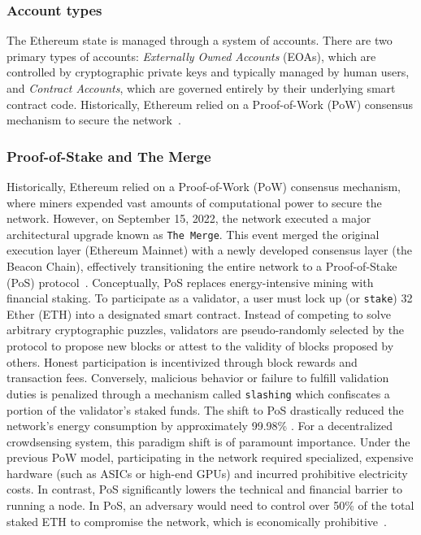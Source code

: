 \subsubsection{Account types}
The Ethereum state is managed through a system of accounts.
There are two primary types of accounts: \emph{Externally Owned Accounts} (EOAs), which are controlled by cryptographic private keys and typically managed by human users, and \emph{Contract Accounts}, which are governed entirely by their underlying smart contract code.
Historically, Ethereum relied on a Proof-of-Work (PoW) consensus mechanism to secure the network~\cite{ethereum}.

\subsubsection{Proof-of-Stake and The Merge}
Historically, Ethereum relied on a Proof-of-Work (PoW) consensus mechanism, where miners expended vast amounts of computational power to secure the network.
However, on September 15, 2022, the network executed a major architectural upgrade known as \texttt{The Merge}.
This event merged the original execution layer (Ethereum Mainnet) with a newly developed consensus layer (the Beacon Chain), effectively transitioning the entire network to a Proof-of-Stake (PoS) protocol~\cite{kelly2023event}.
Conceptually, PoS replaces energy-intensive mining with financial staking.
To participate as a validator, a user must lock up (or \texttt{stake}) 32 Ether (ETH) into a designated smart contract.
Instead of competing to solve arbitrary cryptographic puzzles, validators are pseudo-randomly selected by the protocol to propose new blocks or attest to the validity of blocks proposed by others.
Honest participation is incentivized through block rewards and transaction fees.
Conversely, malicious behavior or failure to fulfill validation duties is penalized through a mechanism called \texttt{slashing} which confiscates a portion of the validator's staked funds.
The shift to PoS drastically reduced the network's energy consumption by approximately 99.98\% \cite{kelly2023event}.
For a decentralized crowdsensing system, this paradigm shift is of paramount importance.
Under the previous PoW model, participating in the network required specialized, expensive hardware (such as ASICs or high-end GPUs) and incurred prohibitive electricity costs.
In contrast, PoS significantly lowers the technical and financial barrier to running a node.
In PoS, an adversary would need to control over 50\% of the total staked ETH to compromise the network, which is economically prohibitive~\cite{ethereum51}.

